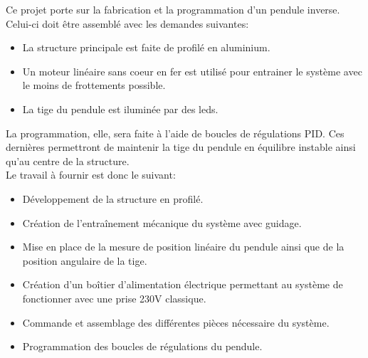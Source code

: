 Ce projet porte sur la fabrication et la programmation d'un pendule inverse. Celui-ci doit être assemblé avec les demandes
suivantes:
\begin{itemize}
    \item La structure principale est faite de profilé en aluminium.
    \item Un moteur linéaire sans coeur en fer est utilisé pour entrainer le système avec le moins de frottements possible.
    \item La tige du pendule est iluminée par des leds.
\end{itemize}

La programmation, elle, sera faite à l'aide de boucles de régulations PID. Ces dernières permettront de maintenir la tige du pendule
en équilibre instable ainsi qu'au centre de la structure.\\

Le travail à fournir est donc le suivant:
\begin{itemize}
    \item Développement de la structure en profilé.
    \item Création de l'entraînement mécanique du système avec guidage.
    \item Mise en place de la mesure de position linéaire du pendule ainsi que de la position angulaire de la tige.
    \item Création d'un boîtier d'alimentation électrique permettant au système de fonctionner avec une prise 230V classique.
    \item Commande et assemblage des différentes pièces nécessaire du système.
    \item Programmation des boucles de régulations du pendule.
\end{itemize}